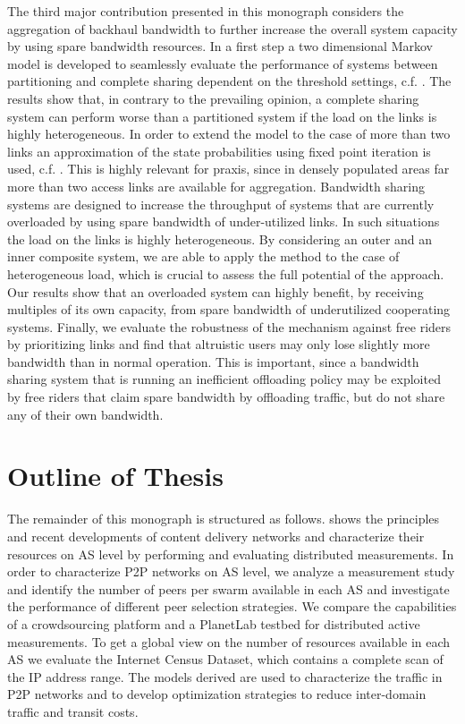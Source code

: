 The third major contribution presented in this monograph considers the aggregation of backhaul bandwidth to further increase the overall system capacity by using spare bandwidth resources.
In a first step a two dimensional Markov model is developed to seamlessly evaluate the performance of systems between partitioning and complete sharing dependent on the threshold settings, c.f. \cite{burger2016phycom}.
The results show that, in contrary to the prevailing opinion, a complete sharing system can perform worse than a partitioned system if the load on the links is highly heterogeneous.
In order to extend the model to the case of more than two links an approximation of the state probabilities using fixed point iteration is used, c.f. \cite{burger2017im}.
This is highly relevant for praxis, since in densely populated areas far more than two access links are available for aggregation.
Bandwidth sharing systems are designed to increase the throughput of systems that are currently overloaded by using spare bandwidth of under-utilized links.
In such situations the load on the links is highly heterogeneous.
By considering an outer and an inner composite system, we are able to apply the method to the case of heterogeneous load, which is crucial to assess the full potential of the approach.
Our results show that an overloaded system can highly benefit, by receiving multiples of its own capacity, from spare bandwidth of underutilized cooperating systems.
Finally, we evaluate the robustness of the mechanism against free riders by prioritizing links and find that altruistic users may only lose slightly more bandwidth than in normal operation.
This is important, since a bandwidth sharing system that is running an inefficient offloading policy may be exploited by free riders that claim spare bandwidth by offloading traffic, but do not share any of their own bandwidth.


\section{Outline of Thesis}\label{sec:introduction:outline}

The remainder of this monograph is structured as follows.
 shows the principles and recent developments of content delivery networks and characterize their resources on AS level by performing and evaluating distributed measurements.
In order to characterize P2P networks on AS level, we analyze a measurement study and identify the number of peers per swarm available in each AS and investigate the performance of different peer selection strategies.
We compare the capabilities of a crowdsourcing platform and a PlanetLab testbed for distributed active measurements.
To get a global view on the number of resources available in each AS we evaluate the Internet Census Dataset, which contains a complete scan of the IP address range.
The models derived are used to characterize the traffic in P2P networks and to develop optimization strategies to reduce inter-domain traffic and transit costs.

